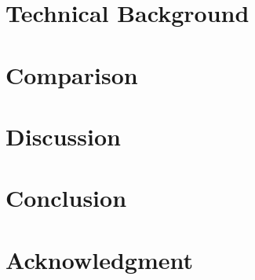 \documentclass[conference]{IEEEtran}
\begin{document}
\section{Technical Background}\label{sec:concepts}


\section{Comparison}\label{sec:comparison}


\section{Discussion}\label{sec:discussion}


\section{Conclusion}\label{sec:conclusion}


\section*{Acknowledgment}




\end{document}
